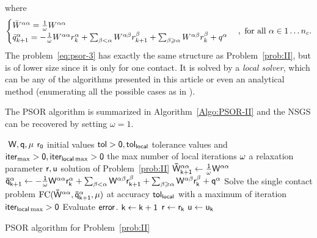 where
\begin{equation}
  \label{eq:psor-2}
  \begin{cases}
    \Bar W^{\alpha\alpha} = \frac 1 \omega W^{\alpha\alpha} \\
    \bar q^{\alpha}_{k+1} = - \frac 1 \omega W^{\alpha\alpha} r^{\alpha}_{k}
    + \sum_{\beta < \alpha}W^{\alpha\beta} r^{\beta}_{k+1} + \sum_{\beta
      \geq \alpha}W^{\alpha\beta} r^{\beta}_{k} + q^\alpha
  \end{cases}
, \text{ for all } \alpha \in 1\ldots n_c.
\end{equation}
The problem~\eqref{eq:psor-3} has exactly the same structure as Problem~\ref{prob:II}, but is of lower size since it is only for one contact.
It is solved by a \emph{local solver}, which can be any of the algorithms presented in this article or even an analytical method (enumerating all the possible cases as in \citep{bonnefon:inria-00553859}).


The PSOR algorithm is summarized in Algorithm~\ref{Algo:PSOR-II} and the NSGS can be recovered by setting $\omega=1$.
%
\begin{algorithm}
  \begin{algorithmic}
    {\sf
      \STATE $ $ 
      \REQUIRE $\sf W,q,\mu$
      \REQUIRE $\sf r_0$ initial values
      \REQUIRE $\sf tol >0, tol_{{local }}$  tolerance values and $\sf iter_{\max}  >0, \sf iter_{local \max}  >0$ the max number of local iterations
      \REQUIRE $\sf \omega$ a relaxation parameter 
      \ENSURE  $\sf r,u$ solution of Problem~\ref{prob:II}
      \STATE $\sf \bar W^{\alpha\alpha}_{k+1} \leftarrow  \frac 1 \omega W^{\alpha\alpha}$
      \STATE $\sf   \bar q^{\alpha}_{k+1} \leftarrow - \frac 1 \omega W^{\alpha\alpha} r^{\alpha}_{k}
      + \sum_{\beta < \alpha}W^{\alpha\beta} r^{\beta}_{k+1} + \sum_{\beta
        \geq \alpha}W^{\alpha\beta} r^{\beta}_{k} + q^\alpha $
      \STATE Solve the single contact problem $\sf \mathrm{FC}(\bar W^{\alpha\alpha},\bar q^{\alpha}_{k+1},\mu)$ at accuracy $\sf tol_{{local }}$ with a maximum of iteration $\sf iter_{local \max}  >0$
      \ENDFOR
      \STATE Evaluate $\sf error$.
      \STATE $\sf k \leftarrow k+1$ 
      \ENDWHILE
      \STATE $\sf r \leftarrow r_{k}$ 
      \STATE $\sf u \leftarrow u_{k}$ 
    }
  \end{algorithmic}
  \caption{PSOR algorithm for Problem~\ref{prob:II}}  \label{Algo:PSOR-II}
\end{algorithm}

